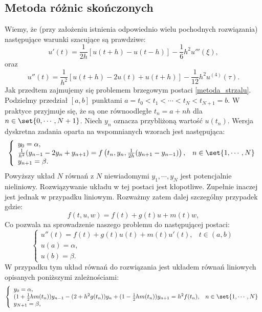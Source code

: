 \subsection{Metoda różnic skończonych} \label{subsection-boundary-theory-finite-differences}
Wiemy, że (przy założeniu istnienia odpowiednio wielu pochodnych rozwiązania) następujące warunki szacujące są prawdziwe:
\begin{equation}\label{roznice_skoncz_I}
u'(t) = \frac{1}{2h}[u(t+h) - u(t-h)] - \frac{1}{6}h^2u'''(\xi),
\end{equation}
oraz 
\begin{equation}\label{roznice_skoncz_II}
u''(t) = \frac{1}{h^2}[u(t+h) - 2u(t) + u(t+h)] - \frac{1}{12}h^2u^{(4)}(\tau).
\end{equation}
Jak przedtem zajmujemy się problemem brzegowym postaci \eqref{metoda_strzalu}. Podzielmy przedział $[a,b]$ punktami $ a=t_0<t_1<\cdots<t_N<t_{N+1}=b $. W praktyce przyjmuje się, że są one równoodległe $t_n = a + nh$ dla $n \in \set{0,\cdots,N+1}$. Niech $y_n$ oznacza przybliżoną wartość $u(t_n)$. Wersja dyskretna zadania oparta na wspomnianych wzorach jest następująca:
$$
\left\{\begin{array}{ll}
y_0 = \alpha, & \\
\frac{1}{h^2}(y_{n-1}-2y_n + y_{n+1}) = f\left(t_n,y_n,\frac{1}{2h}(y_{n+1} - y_{n-1})\right),& n \in \set{1,\cdots,N} \\
y_{n+1} = \beta.
\end{array}\right. 
$$
Powyższy układ $N$ równań z $N$ niewiadomymi $y_1,\cdots,y_N$ jest potencjalnie nieliniowy. Rozwiązywanie układu w tej postaci jest kłopotliwe. Zupełnie inaczej jest jednak w przypadku liniowym. Rozważmy zatem dalej szczególny przypadek gdzie:
$$
f(t,u,w) =f(t) +  g(t) u + m(t) w,
$$
Co pozwala na sprowadzenie naszego problemu do następującej postaci:
\begin{equation}
\left\{\begin{array}{ll}
u''(t)=f(t) + g(t) u(t) + m(t) u'(t), & t \in (a,b) \\
u(a)= \alpha, & \\
u(b)= \beta.
\end{array}\right.
\end{equation}
W przypadku tym układ równań do rozwiązania jest układem równań liniowych opisanych poniższymi zależnościami:
\begin{equation}\label{zagadnienie_liniowe}
\left\{\begin{array}{ll}
y_0 = \alpha, & \\
(1+ \frac{1}{2}h m(t_n))y_{n-1} - (2+ h^2 g(t_n))y_n + (1- \frac{1}{2}h m(t_n))y_{n+1} = h^2 f(t_n) ,& n \in \set{1,\cdots,N} \\
y_{N+1} = \beta,
\end{array}\right. 
\end{equation}
